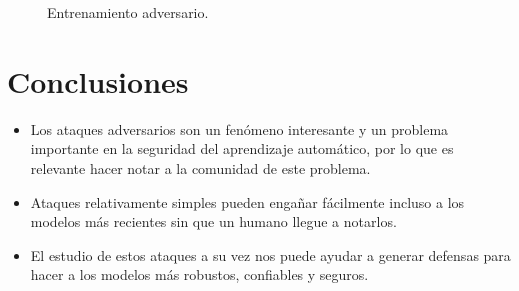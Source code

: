 \documentclass[10pt]{article}
\begin{document}
\begin{multicols*}{2}
\begin{figure}[H]
	\centering
	\caption{Entrenamiento adversario.}
\end{figure}

\section{Conclusiones}

\begin{itemize}
	\item Los ataques adversarios son un fenómeno interesante y un problema importante en la seguridad del aprendizaje automático, por lo que es relevante hacer notar a la comunidad de este problema.
	
	\item Ataques relativamente simples pueden engañar fácilmente incluso a los modelos más recientes sin que un humano llegue a notarlos.
	
	\item El estudio de estos ataques a su vez nos puede ayudar a generar defensas para hacer a los modelos más robustos, confiables y seguros.
\end{itemize}




\end{multicols*}
\end{document}
